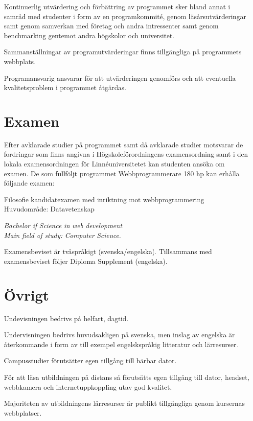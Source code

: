 \documentclass[swedish]{LnuCmThesis}
\begin{document}
Kontinuerlig utvärdering och förbättring av programmet sker bland annat i samråd med
studenter i form av en programkommité, genom läsårsutvärderingar samt genom
samverkan med företag och andra intressenter samt genom benchmarking gentemot
andra högskolor och universitet.

Sammanställningar av programutvärderingar finns tillgängliga på programmets
webbplats.

Programansvarig ansvarar för att utvärderingen genomförs och att eventuella
kvalitetsproblem i programmet åtgärdas.

\section*{Examen}

Efter avklarade studier på programmet samt då avklarade studier motsvarar de
fordringar som finns angivna i Högskoleförordningens examensordning samt i den lokala
examensordningen för Linnéuniversitetet kan studenten ansöka om examen. De som
fullföljt programmet Webbprogrammerare 180 hp kan erhålla följande examen:

Filosofie kandidatexamen med inriktning mot webbprogrammering\\
Huvudområde: Datavetenskap

\textit{Bachelor if Science in web development\\
Main field of study: Computer Science.}

Examensbeviset är tvåspråkigt (svenska/engelska). Tillsammans med
examensbeviset följer Diploma Supplement (engelska).

\section*{Övrigt}
Undevisningen bedrivs på helfart, dagtid.

Undervisningen bedrivs huvudsakligen på svenska, men inslag av engelska är
återkommande i form av till exempel engelskspråkig litteratur och lärresurser.

Campusstudier förutsätter egen tillgång till bärbar dator.

För att läsa utbildningen på distans så förutsätts egen tillgång till dator, headset,
webbkamera och internetuppkoppling utav god kvalitet.

Majoriteten av utbildningens lärresurser är publikt tillgängliga genom kursernas
webbplatser.
\end{document}
